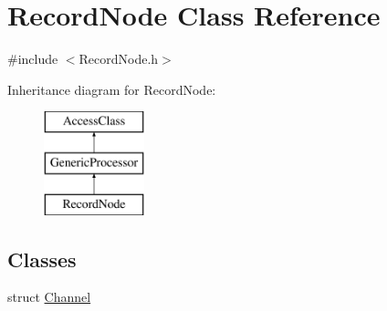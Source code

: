 \hypertarget{classRecordNode}{\section{Record\-Node Class Reference}
\label{classRecordNode}
}


{\ttfamily \#include $<$Record\-Node.\-h$>$}

Inheritance diagram for Record\-Node\-:\begin{figure}[H]
\begin{center}
\leavevmode
\includegraphics[height=3.000000cm]{classRecordNode}
\end{center}
\end{figure}
\subsection*{Classes}
\begin{DoxyCompactItemize}
\item 
struct \hyperlink{structRecordNode_1_1Channel}{Channel}
\end{DoxyCompactItemize}
